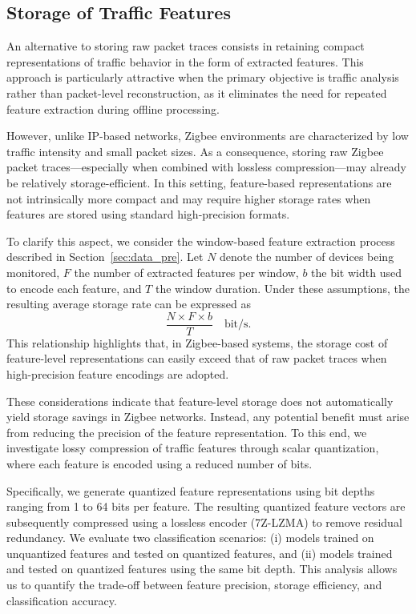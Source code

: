 \subsection{Storage of Traffic Features}
An alternative to storing raw packet traces consists in retaining compact representations of traffic behavior in the form of extracted features. This approach is particularly attractive when the primary objective is traffic analysis rather than packet-level reconstruction, as it eliminates the need for repeated feature extraction during offline processing.

However, unlike IP-based networks, Zigbee environments are characterized by low traffic intensity and small packet sizes. As a consequence, storing raw Zigbee packet traces—especially when combined with lossless compression—may already be relatively storage-efficient. In this setting, feature-based representations are not intrinsically more compact and may require higher storage rates when features are stored using standard high-precision formats.

To clarify this aspect, we consider the window-based feature extraction process described in Section~\ref{sec:data_pre}. Let $N$ denote the number of devices being monitored, $F$ the number of extracted features per window, $b$ the bit width used to encode each feature, and $T$ the window duration. Under these assumptions, the resulting average storage rate can be expressed as
\begin{equation}
    \frac{N \times F \times b}{T} \quad \text{bit/s}.
\end{equation}
This relationship highlights that, in Zigbee-based systems, the storage cost of feature-level representations can easily exceed that of raw packet traces when high-precision feature encodings are adopted.

These considerations indicate that feature-level storage does not automatically yield storage savings in Zigbee networks. Instead, any potential benefit must arise from reducing the precision of the feature representation. To this end, we investigate lossy compression of traffic features through scalar quantization, where each feature is encoded using a reduced number of bits.

Specifically, we generate quantized feature representations using bit depths ranging from 1 to 64 bits per feature. The resulting quantized feature vectors are subsequently compressed using a lossless encoder (7Z-LZMA) to remove residual redundancy. We evaluate two classification scenarios: (i) models trained on unquantized features and tested on quantized features, and (ii) models trained and tested on quantized features using the same bit depth. This analysis allows us to quantify the trade-off between feature precision, storage efficiency, and classification accuracy.



